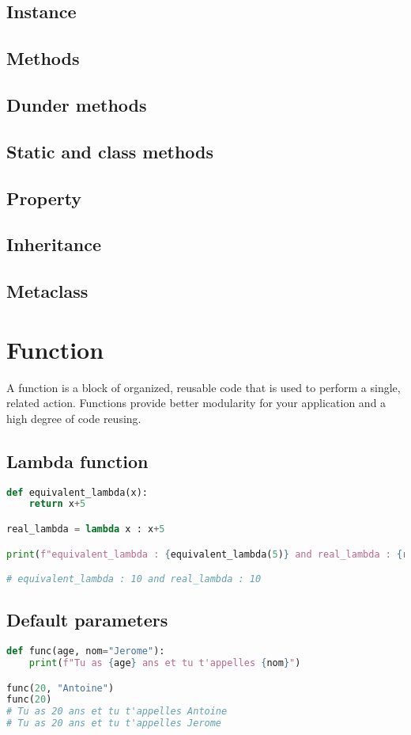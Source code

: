 \documentclass[a4paper, 12pt]{article}
\begin{document}
\subsection{Instance}
\subsection{Methods}
\subsection{Dunder methods}
\subsection{Static and class methods}
\subsection{Property}
\subsection{Inheritance}
\subsection{Metaclass}

\newpage
\section{Function}
\label{sec:Function}
A function is a block of organized, reusable code that is used to perform a single, related action. Functions provide better modularity for your application and a high degree of code reusing.\newline

\subsection{Lambda function}
\label{subsec:Lambda}
\begin{lstlisting}[language=Python]
def equivalent_lambda(x):
	return x+5

real_lambda = lambda x : x+5

print(f"equivalent_lambda : {equivalent_lambda(5)} and real_lambda : {real_lambda(5)}")

# equivalent_lambda : 10 and real_lambda : 10
\end{lstlisting}

\subsection{Default parameters}
\begin{lstlisting}[language=Python]
def func(age, nom="Jerome"):
	print(f"Tu as {age} ans et tu t'appelles {nom}")

func(20, "Antoine")
func(20)
# Tu as 20 ans et tu t'appelles Antoine
# Tu as 20 ans et tu t'appelles Jerome

\end{lstlisting}
\end{document}
